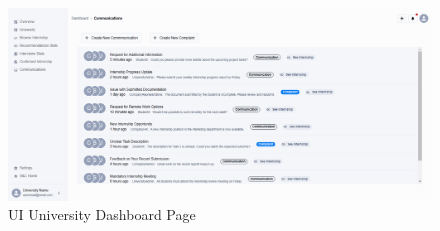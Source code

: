\begin{figure}[H]
    \centering
    \includegraphics[width=\textwidth]{Latex/Images/UI/v2/Uni-Dashboard.png}
    \caption{UI University Dashboard Page}
    \label{fig:universityDashboard}
\end{figure}
